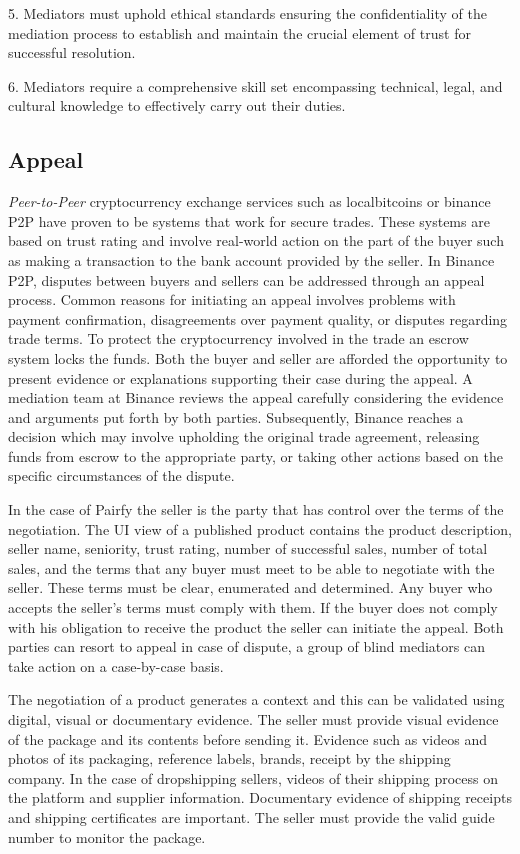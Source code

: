 \documentclass[12pt]{article}
\begin{document}
5. Mediators must uphold ethical standards ensuring the confidentiality of the mediation process to establish and maintain the crucial element of trust for successful resolution.

6. Mediators require a comprehensive skill set encompassing technical, legal, and cultural knowledge to effectively carry out their duties.

\subsection { Appeal } 

\emph{Peer-to-Peer} cryptocurrency exchange services such as localbitcoins or binance P2P have proven to be systems that work for secure trades. These systems are based on trust rating and involve real-world action on the part of the buyer such as making a transaction to the bank account provided by the seller. In Binance P2P, disputes between buyers and sellers can be addressed through an appeal process. Common reasons for initiating an appeal involves problems with payment confirmation, disagreements over payment quality, or disputes regarding trade terms. To protect the cryptocurrency involved in the trade an escrow system locks the funds. Both the buyer and seller are afforded the opportunity to present evidence or explanations supporting their case during the appeal. A mediation team at Binance reviews the appeal carefully considering the evidence and arguments put forth by both parties. Subsequently, Binance reaches a decision which may involve upholding the original trade agreement, releasing funds from escrow to the appropriate party, or taking other actions based on the specific circumstances of the dispute.

In the case of Pairfy the seller is the party that has control over the terms of the negotiation. The UI view of a published product contains the product description, seller name, seniority, trust rating, number of successful sales, number of total sales, and the terms that any buyer must meet to be able to negotiate with the seller. These terms must be clear, enumerated and determined. Any buyer who accepts the seller's terms must comply with them. If the buyer does not comply with his obligation to receive the product the seller can initiate the appeal. Both parties can resort to appeal in case of dispute, a group of blind mediators can take action on a case-by-case basis.

The negotiation of a product generates a context and this can be validated using digital, visual or documentary evidence. The seller must provide visual evidence of the package and its contents before sending it. Evidence such as videos and photos of its packaging, reference labels, brands, receipt by the shipping company. In the case of dropshipping sellers, videos of their shipping process on the platform and supplier information. Documentary evidence of shipping receipts and shipping certificates are important. The seller must provide the valid guide number to monitor the package.
\end{document}
